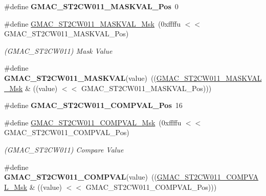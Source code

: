 \begin{DoxyCompactItemize}
\#define {\bfseries G\+M\+A\+C\+\_\+\+S\+T2\+C\+W011\+\_\+\+M\+A\+S\+K\+V\+A\+L\+\_\+\+Pos}~0
\item 
\mbox{\label{group__SAME70__GMAC_ga90086e7296564e8a03d30295e089b56d}} 
\#define \mbox{\hyperlink{group__SAME70__GMAC_ga90086e7296564e8a03d30295e089b56d}{G\+M\+A\+C\+\_\+\+S\+T2\+C\+W011\+\_\+\+M\+A\+S\+K\+V\+A\+L\+\_\+\+Msk}}~(0xffffu $<$$<$ G\+M\+A\+C\+\_\+\+S\+T2\+C\+W011\+\_\+\+M\+A\+S\+K\+V\+A\+L\+\_\+\+Pos)
\begin{DoxyCompactList}\small\item\em (G\+M\+A\+C\+\_\+\+S\+T2\+C\+W011) Mask Value \end{DoxyCompactList}\item 
\mbox{\label{group__SAME70__GMAC_ga2518ce263a7e4cb2842ec4fadc87bbc2}} 
\#define {\bfseries G\+M\+A\+C\+\_\+\+S\+T2\+C\+W011\+\_\+\+M\+A\+S\+K\+V\+AL}(value)~((\mbox{\hyperlink{group__SAMV71__GMAC_ga90086e7296564e8a03d30295e089b56d}{G\+M\+A\+C\+\_\+\+S\+T2\+C\+W011\+\_\+\+M\+A\+S\+K\+V\+A\+L\+\_\+\+Msk}} \& ((value) $<$$<$ G\+M\+A\+C\+\_\+\+S\+T2\+C\+W011\+\_\+\+M\+A\+S\+K\+V\+A\+L\+\_\+\+Pos)))
\item 
\mbox{\label{group__SAME70__GMAC_gab22c0d494eb10b752680ea9a663fae07}} 
\#define {\bfseries G\+M\+A\+C\+\_\+\+S\+T2\+C\+W011\+\_\+\+C\+O\+M\+P\+V\+A\+L\+\_\+\+Pos}~16
\item 
\mbox{\label{group__SAME70__GMAC_ga13d2f2d282e40427344dbb5ca199f627}} 
\#define \mbox{\hyperlink{group__SAME70__GMAC_ga13d2f2d282e40427344dbb5ca199f627}{G\+M\+A\+C\+\_\+\+S\+T2\+C\+W011\+\_\+\+C\+O\+M\+P\+V\+A\+L\+\_\+\+Msk}}~(0xffffu $<$$<$ G\+M\+A\+C\+\_\+\+S\+T2\+C\+W011\+\_\+\+C\+O\+M\+P\+V\+A\+L\+\_\+\+Pos)
\begin{DoxyCompactList}\small\item\em (G\+M\+A\+C\+\_\+\+S\+T2\+C\+W011) Compare Value \end{DoxyCompactList}\item 
\mbox{\label{group__SAME70__GMAC_gabd8efe87650de6a9ddce2779f9b6bb8a}} 
\#define {\bfseries G\+M\+A\+C\+\_\+\+S\+T2\+C\+W011\+\_\+\+C\+O\+M\+P\+V\+AL}(value)~((\mbox{\hyperlink{group__SAMV71__GMAC_ga13d2f2d282e40427344dbb5ca199f627}{G\+M\+A\+C\+\_\+\+S\+T2\+C\+W011\+\_\+\+C\+O\+M\+P\+V\+A\+L\+\_\+\+Msk}} \& ((value) $<$$<$ G\+M\+A\+C\+\_\+\+S\+T2\+C\+W011\+\_\+\+C\+O\+M\+P\+V\+A\+L\+\_\+\+Pos)))

\end{DoxyCompactItemize}
